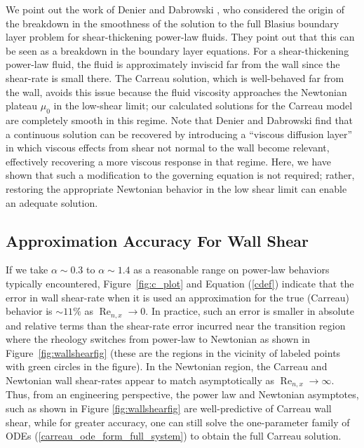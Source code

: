 \documentclass{article}
\begin{document}
We point out the work of Denier and Dabrowski \cite{Dabrowski}, who considered the origin of the breakdown in the smoothness of the solution to the full Blasius boundary layer problem for shear-thickening power-law fluids. They point out that this can be seen as a breakdown in the boundary layer equations. For a shear-thickening power-law fluid, the fluid is approximately inviscid far from the wall since the shear-rate is small there. The Carreau solution, which is well-behaved far from the wall, avoids this issue because the fluid viscosity approaches the Newtonian plateau $\mu_0$ in the low-shear limit; our calculated solutions for the Carreau model are completely smooth in this regime. Note that Denier and Dabrowski find that a continuous solution can be recovered by introducing a ``viscous diffusion layer'' in which viscous effects from shear not normal to the wall become relevant, effectively recovering a more viscous response in that regime. Here, we have shown that such a modification to the governing equation is not required; rather, restoring the appropriate Newtonian behavior in the low shear limit can enable an adequate solution.

\subsection{Approximation Accuracy For Wall Shear}




\hspace{\parindent}If we take $\alpha \sim 0.3$  to $\alpha \sim 1.4$ as a reasonable range on power-law behaviors typically encountered, Figure~\ref{fig:c_plot} and Equation (\ref{cdef}) indicate that the error in wall shear-rate when it is used an approximation for the true (Carreau) behavior is $\sim 11\%$ as $\operatorname{Re}_{n, x} \to 0$. In practice, such an error is smaller in absolute and relative terms than the shear-rate error incurred near the transition region where the rheology switches from power-law to Newtonian as shown in Figure~\ref{fig:wallshearfig}  (these are the regions in the vicinity of labeled points with green circles in the figure). In the Newtonian region, the Carreau and Newtonian wall shear-rates appear to match asymptotically as $\operatorname{Re}_{n, x} \to \infty$.  Thus, from an engineering perspective, the power law and Newtonian asymptotes, such as shown in Figure \ref{fig:wallshearfig} are well-predictive of Carreau wall shear, while for greater accuracy, one can still solve the one-parameter family of ODEs (\ref{carreau_ode_form_full_system}) to obtain the full Carreau solution.
\end{document}
